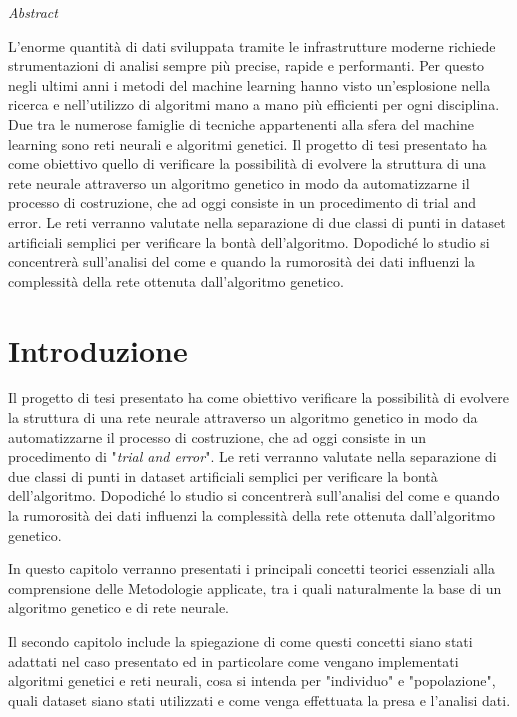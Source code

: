 \documentclass[12pt,a4paper]{report}
\begin{document}
\small\tableofcontents

\newpage

\vspace*{200px}
\LARGE\textit{Abstract}
\normalsize

L'enorme quantità di dati sviluppata tramite le infrastrutture moderne richiede strumentazioni di analisi sempre più precise, rapide e performanti. 
Per questo negli ultimi anni i metodi del machine learning hanno visto un'esplosione nella ricerca e nell'utilizzo di algoritmi mano a mano più efficienti per ogni disciplina. 
Due tra le numerose famiglie di tecniche appartenenti alla sfera del machine learning sono reti neurali e algoritmi genetici. 
Il progetto di tesi presentato ha come obiettivo quello di verificare la possibilità di evolvere la struttura di una rete neurale attraverso un algoritmo genetico in modo da automatizzarne il processo di costruzione, che ad oggi consiste in un procedimento di trial and error.
Le reti verranno valutate nella separazione di due classi di punti in dataset artificiali semplici per verificare la bontà dell'algoritmo. 
Dopodiché lo studio si concentrerà sull'analisi del come e quando la rumorosità dei dati influenzi la complessità della rete ottenuta dall'algoritmo genetico.


\newpage
\normalsize 

\chapter{Introduzione}

Il progetto di tesi presentato ha come obiettivo verificare la possibilità di evolvere la struttura di una rete neurale attraverso un algoritmo genetico in modo da automatizzarne il processo di costruzione, che ad oggi consiste in un procedimento di "\textit{trial and error}".
Le reti verranno valutate nella separazione di due classi di punti in dataset artificiali semplici per verificare la bontà dell'algoritmo. 
Dopodiché lo studio si concentrerà sull'analisi del come e quando la rumorosità dei dati influenzi la complessità della rete ottenuta dall'algoritmo genetico.

In questo capitolo verranno presentati i principali concetti teorici essenziali alla comprensione delle Metodologie applicate, tra i quali naturalmente la base di un algoritmo genetico e di rete neurale.

Il secondo capitolo include la spiegazione di come questi concetti siano stati adattati nel caso presentato ed in particolare come vengano implementati algoritmi genetici e reti neurali, cosa si intenda per "individuo" e "popolazione", quali dataset siano stati utilizzati e come venga effettuata la presa e l'analisi dati.
\end{document}
